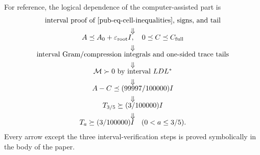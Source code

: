 \documentclass[11pt]{article}
\theoremstyle{remark}
\begin{document}
For reference, the logical dependence of the computer-assisted part is
\[
\begin{array}{c}
\text{interval proof of \eqref{pub-eq-cell-inequalities}, signs, and tail}
\\[1mm]\Downarrow\\[-1mm]
A\preceq A_0+\varepsilon_{\mathrm{root}}I,
\quad 0\preceq C\preceq C_{\mathrm{full}}
\\[1mm]\Downarrow\\[-1mm]
\text{interval Gram/compression integrals and one-sided trace tails}
\\[1mm]\Downarrow\\[-1mm]
\mathcal M\succ0\ \text{by interval }LDL^*
\\[1mm]\Downarrow\\[-1mm]
A-C\preceq(99997/100000)I
\\[1mm]\Downarrow\\[-1mm]
T_{3/5}\succeq(3/100000)I
\\[1mm]\Downarrow\\[-1mm]
T_a\succeq(3/100000)I\quad(0<a\leq3/5).
\end{array}
\]
Every arrow except the three interval-verification steps is proved symbolically in the body of the paper.
\end{document}
